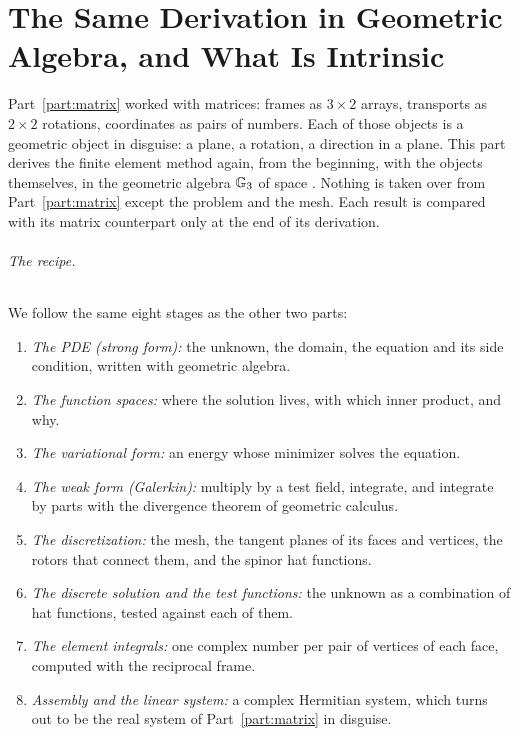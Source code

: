 \part{The Same Derivation in Geometric Algebra, and What Is Intrinsic}
\label{part:ga}

Part~\ref{part:matrix} worked with matrices: frames as $3 \times 2$ arrays, transports as $2 \times 2$ rotations, coordinates as pairs of numbers. Each of those objects is a geometric object in disguise: a plane, a rotation, a direction in a plane. This part derives the finite element method again, from the beginning, with the objects themselves, in the geometric algebra $\mathbb{G}_3$ of space \cite{Doran2003, HestenesSobczyk1984}. Nothing is taken over from Part~\ref{part:matrix} except the problem and the mesh. Each result is compared with its matrix counterpart only at the end of its derivation.

\paragraph{The recipe.} We follow the same eight stages as the other two parts:
\begin{enumerate}
\item \emph{The PDE (strong form):} the unknown, the domain, the equation and its side condition, written with geometric algebra.
\item \emph{The function spaces:} where the solution lives, with which inner product, and why.
\item \emph{The variational form:} an energy whose minimizer solves the equation.
\item \emph{The weak form (Galerkin):} multiply by a test field, integrate, and integrate by parts with the divergence theorem of geometric calculus.
\item \emph{The discretization:} the mesh, the tangent planes of its faces and vertices, the rotors that connect them, and the spinor hat functions.
\item \emph{The discrete solution and the test functions:} the unknown as a combination of hat functions, tested against each of them.
\item \emph{The element integrals:} one complex number per pair of vertices of each face, computed with the reciprocal frame.
\item \emph{Assembly and the linear system:} a complex Hermitian system, which turns out to be the real system of Part~\ref{part:matrix} in disguise.
\end{enumerate}

